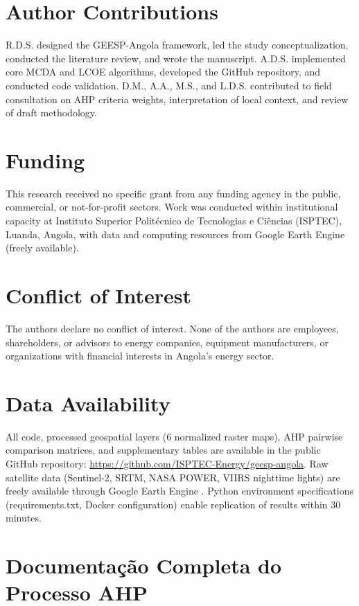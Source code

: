 \documentclass[12pt, a4paper]{article}
\begin{document}
\begin{itemize}
\section*{Author Contributions}
R.D.S. designed the GEESP-Angola framework, led the study conceptualization, conducted the literature review, and wrote the manuscript. A.D.S. implemented core MCDA and LCOE algorithms, developed the GitHub repository, and conducted code validation. D.M., A.A., M.S., and L.D.S. contributed to field consultation on AHP criteria weights, interpretation of local context, and review of draft methodology.

\section*{Funding}
This research received no specific grant from any funding agency in the public, commercial, or not-for-profit sectors. Work was conducted within institutional capacity at Instituto Superior Politécnico de Tecnologias e Ciências (ISPTEC), Luanda, Angola, with data and computing resources from Google Earth Engine (freely available).

\section*{Conflict of Interest}
The authors declare no conflict of interest. None of the authors are employees, shareholders, or advisors to energy companies, equipment manufacturers, or organizations with financial interests in Angola's energy sector.

\section*{Data Availability}
All code, processed geospatial layers (6 normalized raster maps), AHP pairwise comparison matrices, and supplementary tables are available in the public GitHub repository: \url{https://github.com/ISPTEC-Energy/geesp-angola}. Raw satellite data (Sentinel-2, SRTM, NASA POWER, VIIRS nighttime lights) are freely available through Google Earth Engine \citep{nasa_power}. Python environment specifications (requirements.txt, Docker configuration) enable replication of results within 30 minutes.

\appendix

\section{Documentação Completa do Processo AHP}
\label{app:ahp_methodology}


\end{itemize}
\end{document}

